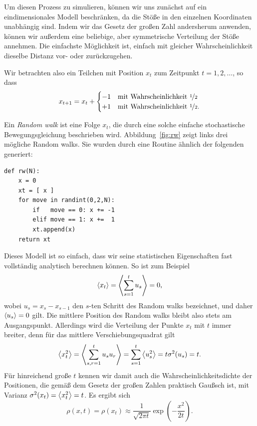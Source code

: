 Um diesen Prozess zu simulieren, können wir uns zunächst auf ein
eindimensionales Modell beschränken, da die Stöße in den
einzelnen Koordinaten unabhängig sind. Indem wir das Gesetz der großen Zahl
andersherum anwenden, können wir außerdem eine beliebige, aber
symmetrische Verteilung der Stöße annehmen. Die einfachste Möglichkeit
ist, einfach mit gleicher Wahrscheinlichkeit dieselbe Distanz vor-
oder zurückzugehen.

Wir betrachten also ein Teilchen mit Position $x_t$ zum Zeitpunkt
$t=1, 2,\ldots$, so dass
\begin{equation}
  \label{eq:rw}
  x_{t+1} = x_t +
  \begin{cases}
    -1 & \text{mit Wahrscheinlichkeit \nicefrac{1}{2}}\\
    +1 & \text{mit Wahrscheinlichkeit \nicefrac{1}{2}}.
  \end{cases}
\end{equation}

Ein \emph{Random walk} ist eine Folge $x_t$, die durch eine solche
einfache stochastische Bewegungsgleichung beschrieben wird.
Abbildung~\ref{fig:rw} zeigt links drei mögliche Random
walks. Sie wurden durch eine Routine ähnlich der folgenden generiert: 
\begin{lstlisting}
def rw(N):
    x = 0
    xt = [ x ] 
    for move in randint(0,2,N):
        if   move == 0: x += -1
        elif move == 1: x +=  1
        xt.append(x)
    return xt
\end{lstlisting}

Dieses Modell ist so einfach, dass wir seine statistischen
Eigenschaften fast vollständig analytisch berechnen können. So ist zum
Beispiel
\begin{equation}
  \left\langle{x_t}\right\rangle = \left\langle{\sum_{s=1}^{t} u_s}\right\rangle = 0, 
\end{equation}
wobei $u_{s} = x_{s} - x_{s-1}$ den $s$-ten Schritt des Random walks
bezeichnet, und daher $\left\langle{u_s}\right\rangle = 0$ gilt. Die mittlere Position des
Random walks bleibt also stets am Ausgangspunkt. Allerdings wird die
Verteilung der Punkte $x_t$ mit $t$ immer breiter, denn für das
mittlere Verschiebungsquadrat gilt
\begin{equation}
  \label{eq:sigmarw}
  \left\langle{x_t^2}\right\rangle =
  \left\langle{\sum_{s,r=1}^{t} u_su_r}\right\rangle = \sum_{s=1}^{t}\left\langle{u_s^2}\right\rangle
  = t\sigma^2(u_s) = t.
\end{equation}
Für hinreichend große $t$ kennen wir damit auch die
Wahrscheinlichkeitsdichte der Positionen, die gemäß dem Gesetz der
großen Zahlen praktisch Gaußsch ist, mit Varianz $\sigma^2(x_t) =
\left\langle{x_t^2}\right\rangle = t$. Es ergibt sich
\begin{equation}
  \rho(x, t) = \rho(x_t) \approx \frac{1}{\sqrt{2\pi t}}
  \exp\left(-\frac{x^2}{2t}\right).
\end{equation}


